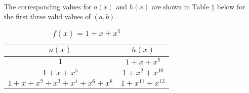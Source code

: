 \begin{example}
The corresponding values for $a(x)$ and $h(x)$ are shown in Table \ref{novelTab8} below for the first three valid values of $(a,b)$.
\begin{table}[htbp]
 \caption{$f(x)=1+x+x^5$}
\centering
 \begin{tabular}{c c} 
 \hline
 $a(x)$ & $h(x)$\\ [0.5ex] 
 \hline\hline
$1$ & $1+x+x^{5}$\\ 
\hline
$1+x+x^5$ &  $1+x^2+x^{10}$\\
\hline
$1+x+x^2+x^3+x^4+x^{6}+x^{8}$ & $1+x^{11}+x^{13}$\\
 \end{tabular}
 \label{novelTab8}
\end{table}
\end{example}

